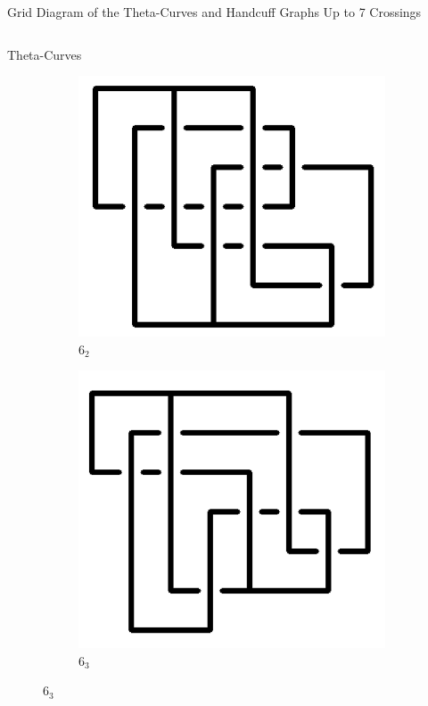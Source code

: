 \documentclass[final]{beamer}
\begin{document}
\begin{frame}[t]
\begin{alertblock}{Grid Diagram of the Theta-Curves and Handcuff Graphs Up to 7 Crossings}
\begin{columns}[t]
\begin{column}{0.5\textwidth}
\begin{alertblock}{Theta-Curves}
\begin{figure}
    \begin{subfigure}{0.075\textwidth}
    \includegraphics[width=\columnwidth]{../Midterm_Poster/grid_diagram/theta_6_2.png}
    \caption{$6_2$} 
    \end{subfigure}
    \begin{subfigure}{0.075\textwidth}
    \includegraphics[width=\columnwidth]{../Midterm_Poster/grid_diagram/theta_6_3.png}
    \caption{$6_3$} 
    \end{subfigure}

\end{figure}
\end{alertblock}
\end{column}
\end{columns}
\end{alertblock}
\end{frame}
\end{document}
